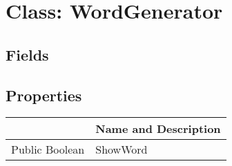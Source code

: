 \documentclass[11pt, oneside, a4paper]{book}
\begin{document}
\hypertarget{SoftwareEngineeringTools.{}Documentation.{}WordGenerator}{}
\section{Class: WordGenerator}

\subsection{Fields}

\subsection{Properties}
\begin{center}
\begin{tabular}{| p{3cm} | p{12cm} | }
\hline
\textbf{ } & \textbf{ Name and Description}\\
\hline
 Public  Boolean &  ShowWord\hypertarget{SoftwareEngineeringTools.{}Documentation.{}WordGenerator.{}ShowWord}{}\\
\hline
\end{tabular}
\end{center}
\end{document}
